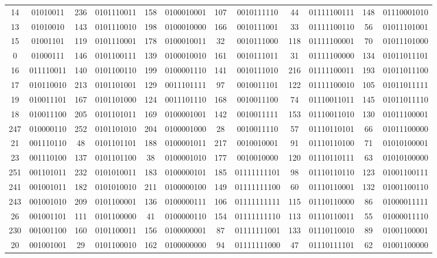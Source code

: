 \documentclass[conference,onecolumn,12pt]{IEEEtran}
\numberwithin{equation}{subsection}
\begin{document}
\begin{itemize}
\begin{table}[H]
\begin{tabular}{cccccccccccc}
14 & 01010011 & 236 & 0101110011 & 158 & 0100010001 & 107 & 0010111110 & 44 & 01111100111 & 148 & 01110001010 \\
13 & 01010010 & 143 & 0101110010 & 198 & 0100010000 & 166 & 0010111001 & 33 & 01111100110 & 56 & 01011101001 \\
15 & 01001101 & 119 & 0101110001 & 178 & 0100010011 & 32 & 0010111000 & 118 & 01111100001 & 70 & 01011101000 \\
0 & 01000111 & 146 & 0101100111 & 139 & 0100010010 & 161 & 0010111011 & 31 & 01111100000 & 134 & 01011011101 \\
16 & 011110011 & 140 & 0101100110 & 199 & 0100001110 & 141 & 0010111010 & 216 & 01111100011 & 193 & 01011011100 \\
17 & 010110010 & 213 & 0101101001 & 129 & 0011101111 & 97 & 0010011101 & 122 & 01111100010 & 105 & 01011011111 \\
19 & 010011101 & 167 & 0101101000 & 124 & 0011101110 & 168 & 0010011100 & 74 & 01110011011 & 145 & 01011011110 \\
18 & 010011100 & 205 & 0101101011 & 169 & 0100001001 & 142 & 0010011111 & 153 & 01110011010 & 130 & 01011100001 \\
247 & 010000110 & 252 & 0101101010 & 204 & 0100001000 & 28 & 0010011110 & 57 & 01110110101 & 66 & 01011100000 \\
21 & 001110110 & 48 & 0101101101 & 188 & 0100001011 & 217 & 0010010001 & 91 & 01110110100 & 71 & 01010100001 \\
23 & 001110100 & 137 & 0101101100 & 38 & 0100001010 & 177 & 0010010000 & 120 & 01110110111 & 63 & 01010100000 \\
251 & 001101011 & 232 & 0101010011 & 183 & 0100000101 & 185 & 01111111101 & 98 & 01110110110 & 123 & 01001100111 \\
241 & 001001011 & 182 & 0101010010 & 211 & 0100000100 & 149 & 01111111100 & 60 & 01110110001 & 132 & 01001100110 \\
243 & 001001010 & 209 & 0101100001 & 136 & 0100000111 & 106 & 01111111111 & 115 & 01110110000 & 86 & 01000011111 \\
26 & 001001101 & 111 & 0101100000 & 41 & 0100000110 & 154 & 01111111110 & 113 & 01110110011 & 55 & 01000011110 \\
230 & 001001100 & 160 & 0101100011 & 156 & 0100000001 & 87 & 01111111001 & 133 & 01110110010 & 89 & 01001100001 \\
20 & 001001001 & 29 & 0101100010 & 162 & 0100000000 & 94 & 01111111000 & 47 & 01110111101 & 62 & 01001100000 \\

\end{tabular}
\end{table}
\end{itemize}
\end{document}
